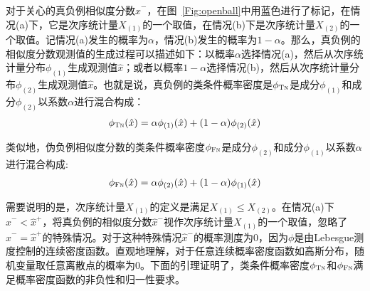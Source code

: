 对于关心的真负例相似度分数$ \hat{x}^- $，在图~\ref{Fig:openball}中用蓝色进行了标记，在情况(a)下，它是次序统计量$ X_{(1)} $的一个取值，在情况(b)下是次序统计量$ X_{(2)} $的一个取值。记情况(a)发生的概率为$\alpha$，情况(b)发生的概率为$1-\alpha$。那么，真负例的相似度分数观测值的生成过程可以描述如下：以概率$\alpha$选择情况(a)，然后从次序统计量分布$\phi_{(1)}$生成观测值$\hat{x}$；或者以概率$1-\alpha$选择情况(b)，然后从次序统计量分布$\phi_{(2)}$生成观测值$\hat{x}$。也就是说，真负例的类条件概率密度是$\phi_{\textsc{Tn}}$是成分$\phi_{(1)}$和成分$\phi_{(2)}$以系数$\alpha$进行混合构成：
\begin{eqnarray}
	\phi_{\textsc{Tn}}(\hat{x}) = \alpha \phi_{(1)}(\hat{x}) + (1-\alpha)\phi_{(2)}(\hat{x}) \label{eq:phitn}
\end{eqnarray}

类似地，伪负例相似度分数的类条件概率密度$\phi_{\textsc{Fn}}$是成分$\phi_{(2)}$和成分$\phi_{(1)}$以系数$\alpha$进行混合构成:
\begin{eqnarray}
	\phi_{\textsc{Fn}}(\hat{x}) = \alpha \phi_{(2)}(\hat{x}) + (1-\alpha)\phi_{(1)}(\hat{x})\label{eq:phifn}
\end{eqnarray}

需要说明的是，次序统计量$X_{(1)}$的定义是满足$X_{(1)}\leq X_{(2)}$。在情况(a)下$\hat{x}^- < \hat{x}^+$，将真负例的相似度分数$\hat{x}^-$视作次序统计量$X_{(1)}$的一个取值，忽略了$\hat{x}^- = \hat{x}^+$的特殊情况。对于这种特殊情况$\hat{x}^-$的概率测度为0，因为$\phi$是由Lebesgue测度控制的连续密度函数。直观地理解，对于任意连续概率密度函数如高斯分布，随机变量取任意离散点的概率为0。下面的引理证明了，类条件概率密度$\phi_{\textsc{Tn}}$和$\phi_{\textsc{Fn}}$满足概率密度函数的非负性和归一性要求。

